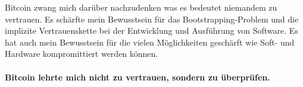 Bitcoin zwang mich darüber nachzudenken was es bedeutet niemandem zu vertrauen.
Es schärfte mein Bewusstsein für das Bootstrapping-Problem und die implizite
Vertrauenskette bei der Entwicklung und Ausführung von Software. Es hat auch
mein Bewusstsein für die vielen Möglichkeiten geschärft wie Soft- und Hardware
kompromittiert werden können.

\paragraph{Bitcoin lehrte mich nicht zu vertrauen, sondern zu überprüfen.}

%
%
%
%

